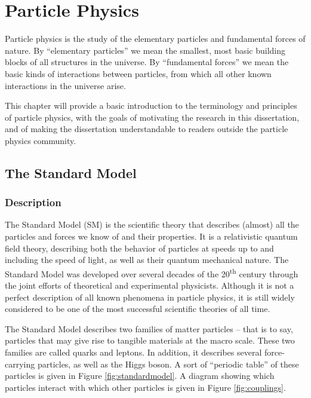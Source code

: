 \chapter{Particle Physics}
\label{chap:particlephysics}

Particle physics is the study of the elementary particles and fundamental forces
of nature. By ``elementary particles'' we mean the smallest, most
basic building blocks of all structures in the universe. By
``fundamental forces'' we mean the basic kinds of interactions between
particles, from which all other known interactions in the universe
arise.

This chapter will provide a basic introduction to the terminology
and principles of particle physics, with the goals of motivating the
research in this dissertation, and of making the dissertation understandable to
readers outside the particle physics community.

\section{The Standard Model}
\label{sec:standardmodel}

\subsection{Description}
\label{ssec:SMdescription}

The Standard Model (SM) is the scientific theory that describes
(almost) all the particles and forces we know of and their properties.
It is a relativistic quantum field theory, describing both the
behavior of particles at speeds up to and including the speed of
light, as well as their quantum mechanical nature.
The Standard Model was developed over several decades of the 20\textsuperscript{th}
century through the joint efforts of theoretical and experimental physicists.
Although it is not a perfect description of all known phenomena in
particle physics, it is still widely considered to be one of the most
successful scientific theories of all time. %

The Standard Model describes two families of matter particles -- that is
to say, particles that may give rise to tangible materials at the macro scale.
These two families are called quarks and leptons. In addition, it
describes several force-carrying particles, as well as the Higgs
boson. A sort of ``periodic table'' of these particles is given in
Figure \ref{fig:standardmodel}. A diagram showing which particles
interact with which other particles is given in Figure \ref{fig:couplings}.

